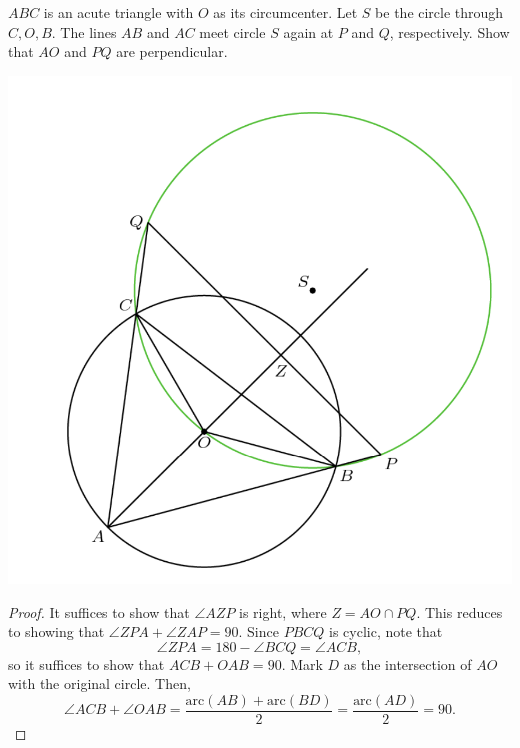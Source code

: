 \documentclass[12pt]{scrartcl}
\newcommand{\<}{\langle}
\renewcommand{\>}{\rangle}
\begin{document}
\begin{proposition} $ABC$ is an acute triangle with $O$ as its circumcenter.  Let $S$ be the circle through $C, O, B$.  The lines $AB$ and $AC$ meet circle $S$ again at $P$ and $Q$, respectively.  Show that $AO$ and $PQ$ are perpendicular.  
\end{proposition}
\begin{center}
\includegraphics[scale=0.6]{graphics/CQp1.png}
\end{center}
\begin{proof}
It suffices to show that $\angle AZP$ is right, where $Z = AO \cap PQ$.  This reduces to showing that $\angle ZPA + \angle ZAP = 90$.  Since $PBCQ$ is cyclic, note that 
$$\angle ZPA = 180 - \angle BCQ = \angle ACB,$$
so it suffices to show that $ACB + OAB = 90$.  Mark $D$ as the intersection of $AO$ with the original circle.  Then, 
$$\angle ACB + \angle OAB = \frac{\text{arc}(AB) + \text{arc}(BD)}{2} = \frac{\text{arc}(AD)}{2} = 90.$$
\end{proof}
\end{document}
